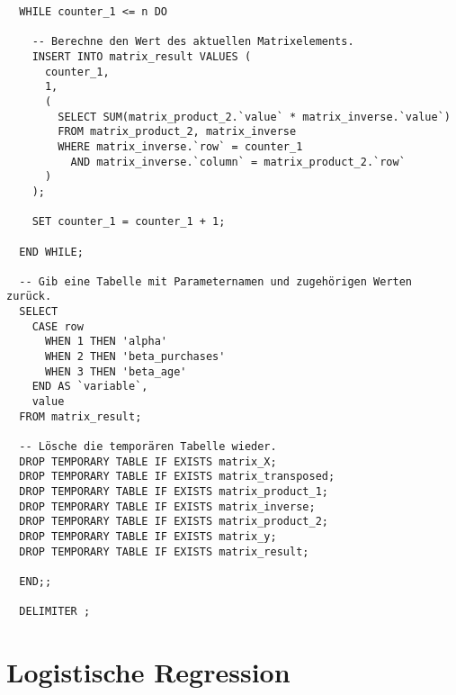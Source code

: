 \begin{verbatim}
  WHILE counter_1 <= n DO

    -- Berechne den Wert des aktuellen Matrixelements.
    INSERT INTO matrix_result VALUES (
      counter_1,
      1,
      (
        SELECT SUM(matrix_product_2.`value` * matrix_inverse.`value`)
        FROM matrix_product_2, matrix_inverse
        WHERE matrix_inverse.`row` = counter_1
          AND matrix_inverse.`column` = matrix_product_2.`row`
      )
    );

    SET counter_1 = counter_1 + 1;

  END WHILE;

  -- Gib eine Tabelle mit Parameternamen und zugehörigen Werten zurück.
  SELECT
    CASE row
      WHEN 1 THEN 'alpha'
      WHEN 2 THEN 'beta_purchases'
      WHEN 3 THEN 'beta_age'
    END AS `variable`,
    value
  FROM matrix_result;

  -- Lösche die temporären Tabelle wieder.
  DROP TEMPORARY TABLE IF EXISTS matrix_X;
  DROP TEMPORARY TABLE IF EXISTS matrix_transposed;
  DROP TEMPORARY TABLE IF EXISTS matrix_product_1;
  DROP TEMPORARY TABLE IF EXISTS matrix_inverse;
  DROP TEMPORARY TABLE IF EXISTS matrix_product_2;
  DROP TEMPORARY TABLE IF EXISTS matrix_y;
  DROP TEMPORARY TABLE IF EXISTS matrix_result;

  END;;

  DELIMITER ;
\end{verbatim}

\section{Logistische Regression}
\label{appendix:D:3}

